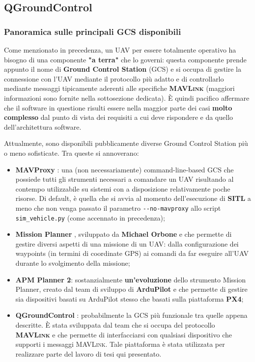 \documentclass[a4paper, 12pt, oneside]{article}
\theoremstyle{definition}
\begin{document}
\newpage

\subsection{QGroundControl}

\subsubsection{Panoramica sulle principali GCS disponibili}

Come menzionato in precedenza, un UAV per essere totalmente operativo ha bisogno di una componente \textbf{"a terra"} che lo governi: questa componente prende appunto il nome di \textbf{Ground Control Station} (GCS) e si occupa di gestire la connessione con l'UAV mediante il protocollo più adatto e di controllarlo mediante messaggi tipicamente aderenti alle specifiche \textbf{\textsc{MAVLink}} (maggiori informazioni sono fornite nella sottosezione dedicata). È quindi pacifico affermare che il software in questione risulti essere nella maggior parte dei casi \textbf{molto complesso} dal punto di vista dei requisiti a cui deve rispondere e da quello dell'architettura software.

Attualmente, sono disponibili pubblicamente diverse Ground Control Station più o meno sofisticate. Tra queste si annoverano:

\begin{itemize}
    \item \textbf{MAVProxy} \cite{mavproxy}: una (non necessariamente) command-line-based GCS che possiede tutti gli strumenti necessari a comandare un UAV risultando al contempo utilizzabile su sistemi con a disposizione relativamente poche risorse. Di default, è quella che si avvia al momento dell'esecuzione di \textbf{SITL} a meno che non venga passato il parametro \texttt{-{}-no-mavproxy} allo script \texttt{sim\_vehicle.py} (come accennato in precedenza);
    \item \textbf{Mission Planner} \cite{mission-planner}, sviluppato da \textbf{Michael Orbone} e che permette di gestire diversi aspetti di una missione di un UAV: dalla configurazione dei waypoints (in termini di coordinate GPS) ai comandi da far eseguire all'UAV durante lo svolgimento della missione;
    \item \textbf{APM Planner 2}: sostanzialmente \textbf{un'evoluzione} dello strumento Mission Planner, creato dal team di sviluppo di \textbf{ArduPilot} e che permette di gestire sia dispositivi basati su ArduPilot stesso che basati sulla piattaforma \textbf{PX4};
    \item \textbf{QGroundControl} \cite{qgroundcontrol}: probabilmente la GCS più funzionale tra quelle appena descritte. È stata sviluppata dal team che si occupa del protocollo \textbf{\textsc{MAVLink}} e che permette di interfacciarsi con qualsiasi dispositivo che supporti i messaggi \textsc{MAVLink}. Tale piattaforma è stata utilizzata per realizzare parte del lavoro di tesi qui presentato. 
\end{itemize}
\end{document}
